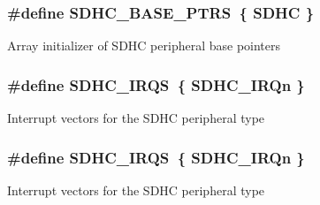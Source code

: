 \subsubsection[{\texorpdfstring{S\+D\+H\+C\+\_\+\+B\+A\+S\+E\+\_\+\+P\+T\+RS}{SDHC_BASE_PTRS}}]{\setlength{\rightskip}{0pt plus 5cm}\#define S\+D\+H\+C\+\_\+\+B\+A\+S\+E\+\_\+\+P\+T\+RS~\{ {\bf S\+D\+HC} \}}\hypertarget{group__SDHC__Peripheral__Access__Layer_gaba68469bfde58472af9853b68fee61de}{}\label{group__SDHC__Peripheral__Access__Layer_gaba68469bfde58472af9853b68fee61de}
Array initializer of S\+D\+HC peripheral base pointers 
\subsubsection[{\texorpdfstring{S\+D\+H\+C\+\_\+\+I\+R\+QS}{SDHC_IRQS}}]{\setlength{\rightskip}{0pt plus 5cm}\#define S\+D\+H\+C\+\_\+\+I\+R\+QS~\{ {\bf S\+D\+H\+C\+\_\+\+I\+R\+Qn} \}}\hypertarget{group__SDHC__Peripheral__Access__Layer_gac8a2a352713668bfc1ee4dc28bb16783}{}\label{group__SDHC__Peripheral__Access__Layer_gac8a2a352713668bfc1ee4dc28bb16783}
Interrupt vectors for the S\+D\+HC peripheral type 
\subsubsection[{\texorpdfstring{S\+D\+H\+C\+\_\+\+I\+R\+QS}{SDHC_IRQS}}]{\setlength{\rightskip}{0pt plus 5cm}\#define S\+D\+H\+C\+\_\+\+I\+R\+QS~\{ {\bf S\+D\+H\+C\+\_\+\+I\+R\+Qn} \}}\hypertarget{group__SDHC__Peripheral__Access__Layer_gac8a2a352713668bfc1ee4dc28bb16783}{}\label{group__SDHC__Peripheral__Access__Layer_gac8a2a352713668bfc1ee4dc28bb16783}
Interrupt vectors for the S\+D\+HC peripheral type 